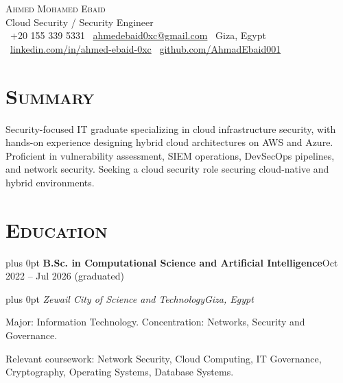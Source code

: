 \documentclass[10pt,letterpaper]{article}
\newcommand{\headerrow}[2]{%
  \begingroup\rightskip=0pt plus 0pt\relax
  #1\hfill #2\par\endgroup}
\newcommand{\entry}[4]{%
  \headerrow{\textbf{#1}}{#2}%
  \headerrow{\textit{#3}}{\textit{#4}}%
  \vspace{0.04em}}
\newenvironment{block}{\vspace{0.03em}\begingroup}{\endgroup\vspace{0.06em}}
\begin{document}
\begin{center}
  {\Huge\scshape Ahmed Mohamed Ebaid}\\[0.4em]
  {\normalsize Cloud Security / Security Engineer}\\[0.35em]
  \small
  \faPhone* \ +20 155 339 5331 \quad
  \faEnvelope \ \href{mailto:ahmedebaid0xc@gmail.com}{ahmedebaid0xc@gmail.com} \quad
  \faMapMarker* \ Giza, Egypt\\[0.2em]
  \faLinkedin \ \href{https://www.linkedin.com/in/ahmed-ebaid-0xc/}{linkedin.com/in/ahmed-ebaid-0xc} \quad
  \faGithub \ \href{https://github.com/AhmadEbaid001}{github.com/AhmadEbaid001}
\end{center}
\vspace{-0.2em}

\section*{\textsc{Summary}}
Security-focused IT graduate specializing in cloud infrastructure security, with hands-on experience designing hybrid cloud
architectures on AWS and Azure. Proficient in vulnerability assessment, SIEM operations, DevSecOps pipelines, and network
security. Seeking a cloud security role securing cloud-native and hybrid environments.

\section*{\textsc{Education}}
\begin{block}
\entry{B.Sc. in Computational Science and Artificial Intelligence}{Oct 2022 -- Jul 2026 (graduated)}
      {Zewail City of Science and Technology}{Giza, Egypt}
\begin{tight}
  \item Major: Information Technology. Concentration: Networks, Security and Governance.
  \item Relevant coursework: Network Security, Cloud Computing, IT Governance, Cryptography, Operating Systems, Database Systems.
\end{tight}
\end{block}

\end{document}
